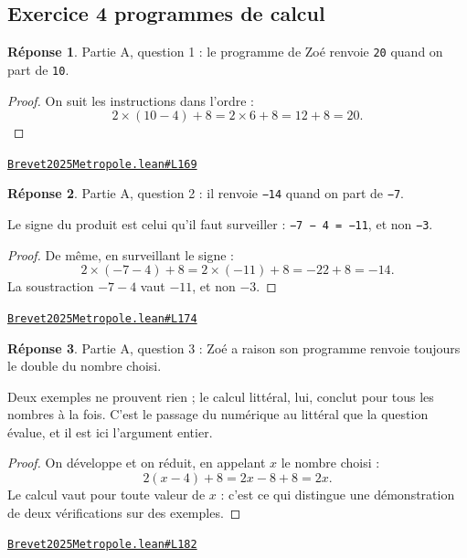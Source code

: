 \documentclass[11pt,a4paper]{article}
\theoremstyle{definition}
\theoremstyle{plain}
\theoremstyle{definition}
\newtheorem*{reponse}{Réponse}
\newcommand{\source}[2]{\par\smallskip\noindent\hfill{\footnotesize\href{#1}{\texttt{#2}}}\par\smallskip}
\begin{document}
\subsection{Exercice 4 \textemdash{} programmes de calcul}

\begin{reponse}
Partie A, question 1 : le programme de Zoé renvoie \texttt{20} quand on part de \texttt{10}.
\end{reponse}
\begin{proof}
On suit les instructions dans l'ordre :
\[ 2 \times (10 - 4) + 8 = 2 \times 6 + 8 = 12 + 8 = 20 . \]
\end{proof}
\source{https://github.com/Commutator-IO/learn-lean/blob/main/exams/2025/Brevet2025Metropole.lean\#L169}{Brevet2025Metropole.lean\#L169}

\begin{reponse}
Partie A, question 2 : il renvoie \texttt{−14} quand on part de \texttt{−7}.

Le signe du produit est celui qu'il faut surveiller : \texttt{−7 − 4 = −11}, et non \texttt{−3}.
\end{reponse}
\begin{proof}
De même, en surveillant le signe :
\[ 2 \times (-7 - 4) + 8 = 2 \times (-11) + 8 = -22 + 8 = -14 . \]
La soustraction $-7 - 4$ vaut $-11$, et non $-3$.
\end{proof}
\source{https://github.com/Commutator-IO/learn-lean/blob/main/exams/2025/Brevet2025Metropole.lean\#L174}{Brevet2025Metropole.lean\#L174}

\begin{reponse}
Partie A, question 3 : Zoé a raison \textemdash{} son programme renvoie toujours le double
du nombre choisi.

Deux exemples ne prouvent rien ; le calcul littéral, lui, conclut pour tous les
nombres à la fois. C'est le passage du numérique au littéral que la question évalue,
et il est ici l'argument entier.
\end{reponse}
\begin{proof}
On développe et on réduit, en appelant $x$ le nombre choisi :
\[ 2(x - 4) + 8 = 2x - 8 + 8 = 2x . \]
Le calcul vaut pour toute valeur de $x$ : c'est ce qui distingue une démonstration de deux
vérifications sur des exemples.
\end{proof}
\source{https://github.com/Commutator-IO/learn-lean/blob/main/exams/2025/Brevet2025Metropole.lean\#L182}{Brevet2025Metropole.lean\#L182}
\end{document}
